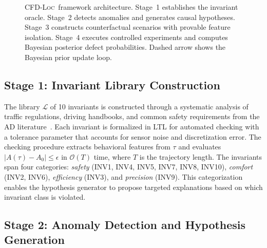 \documentclass[journal]{IEEEtran}
\theoremstyle{plain}
\newcommand{\methodname}{\textsc{CFD-Loc}}
\newcommand{\invlib}{\mathcal{L}}
\newcommand{\diag}{\mathcal{D}}
\begin{document}
\begin{figure}[t]
\caption{\methodname\ framework architecture. Stage~1 establishes the invariant oracle. Stage~2 detects anomalies and generates causal hypotheses. Stage~3 constructs counterfactual scenarios with provable feature isolation. Stage~4 executes controlled experiments and computes Bayesian posterior defect probabilities. Dashed arrow shows the Bayesian prior update loop.}
\label{fig:pipeline}
\end{figure}

\subsection{Stage 1: Invariant Library Construction}

The library $\invlib$ of 10 invariants is constructed through a systematic analysis of traffic regulations, driving handbooks, and common safety requirements from the AD literature~\cite{liu2024survey,cao2022scenario}. Each invariant is formalized in LTL for automated checking with a tolerance parameter that accounts for sensor noise and discretization error. The checking procedure extracts behavioral features from $\tau$ and evaluates $|A(\tau) - A_0| \leq \epsilon$ in $\mathcal{O}(T)$ time, where $T$ is the trajectory length. The invariants span four categories: \emph{safety} (INV1, INV4, INV5, INV7, INV8, INV10), \emph{comfort} (INV2, INV6), \emph{efficiency} (INV3), and \emph{precision} (INV9). This categorization enables the hypothesis generator to propose targeted explanations based on which invariant class is violated.

\subsection{Stage 2: Anomaly Detection and Hypothesis Generation}
\end{document}

